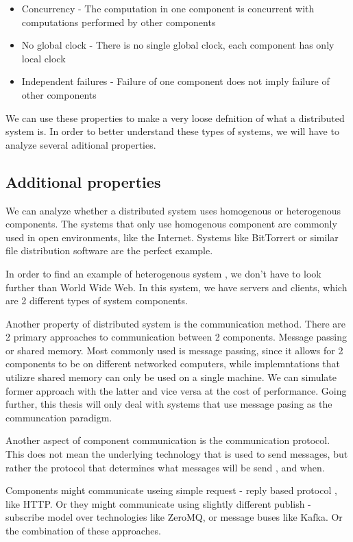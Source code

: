 \begin{itemize}
    \item Concurrency - The computation in one component is concurrent with computations performed by other components
    \item No global clock - There is no single global clock, each component has only local clock
    \item Independent failures - Failure of one component does not imply failure of other components
\end{itemize}

We can use these properties to make a very loose defnition of what a distributed system is. In order to better understand these
types of systems, we will have to analyze several aditional properties.

\subsection{Additional properties}

We can analyze whether a distributed system uses homogenous or heterogenous components.
The systems that only use homogenous component are commonly used in open
environments, like the Internet. Systems like BitTorrert or similar file distribution software are the perfect example.

In order to find an example of heterogenous system , we don't have to look further than World Wide Web. In this system,
we have servers and clients, which are 2 different types of system components.

Another property of distributed system is the communication method. There are 2 primary approaches to communication between 2 components. Message passing or shared
memory. Most commonly used is message passing, since it allows for 2 components to be on different networked computers, while implemntations that utilizre
shared memory can only be used on a single machine. We can simulate former approach with the latter and vice versa at the cost of performance.
Going further, this thesis will only deal with systems that use message pasing as the communcation paradigm.

Another aspect of component communication is the communication protocol. This does not mean the underlying technology that is used to send
messages, but rather the protocol that determines what messages will be send , and when.

Components might communicate useing simple request - reply based protocol , like HTTP. Or they might communicate using slightly different
publish - subscribe model over technologies like ZeroMQ, or message buses like Kafka. Or the combination of these approaches.

